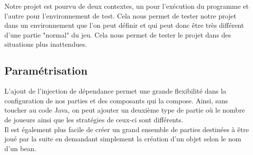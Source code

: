 Notre projet est pourvu de deux contextes, un pour l'exécution du programme et l'autre pour l'environnement de test. Cela nous permet de tester notre projet dans un environnement que l'on peut définir et qui peut donc être très différent d'une partie "normal" du jeu. Cela nous permet de tester le projet dans des situations plus inattendues.

\subsection{Paramétrisation}

L'ajout de l'injection de dépendance permet une grande flexibilité dans la configuration de nos parties et des composants qui la compose. Ainsi, sans toucher au code Java, on peut ajouter un deuxième type de partie où le nombre de joueurs ainsi que les stratégies de ceux-ci sont différents.\\ Il est également plus facile de créer un grand ensemble de parties destinées à être joué par la suite en demandant simplement la création d'un objet selon le nom d'un bean.